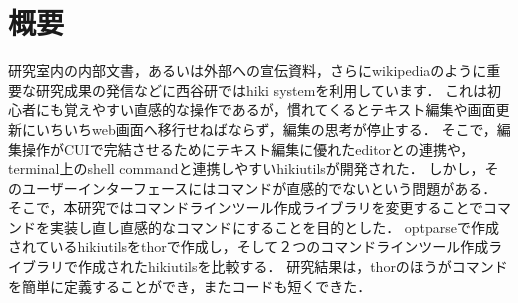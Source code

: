 \section{概要}
研究室内の内部文書，あるいは外部への宣伝資料，さらにwikipediaのように重要な研究成果の発信などに西谷研ではhiki systemを利用しています．
これは初心者にも覚えやすい直感的な操作であるが，慣れてくるとテキスト編集や画面更新にいちいちweb画面へ移行せねばならず，編集の思考が停止する．
そこで，編集操作がCUIで完結させるためにテキスト編集に優れたeditorとの連携や，terminal上のshell commandと連携しやすいhikiutilsが開発された．
しかし，そのユーザーインターフェースにはコマンドが直感的でないという問題がある．
そこで，本研究ではコマンドラインツール作成ライブラリを変更することでコマンドを実装し直し直感的なコマンドにすることを目的とした．
optparseで作成されているhikiutilsをthorで作成し，そして２つのコマンドラインツール作成ライブラリで作成されたhikiutilsを比較する．
研究結果は，thorのほうがコマンドを簡単に定義することができ，またコードも短くできた．

